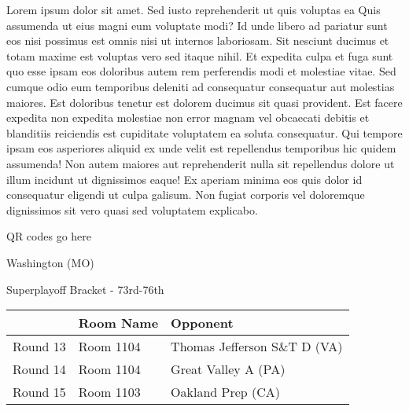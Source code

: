 \documentclass{article}%
\begin{document}
\vspace*{8pt}%
\linebreak%
\newline%
\newline%
Lorem ipsum dolor sit amet. Sed iusto reprehenderit ut quis voluptas ea Quis assumenda ut eius magni eum voluptate modi? Id unde libero ad pariatur sunt eos nisi possimus est omnis nisi ut internos laboriosam. Sit nesciunt ducimus et totam maxime est voluptas vero sed itaque nihil. Et expedita culpa et fuga sunt quo esse ipsam eos doloribus autem rem perferendis modi et molestiae vitae.\newline%
\newline%
Sed cumque odio eum temporibus deleniti ad consequatur consequatur aut molestias maiores. Est doloribus tenetur est dolorem ducimus sit quasi provident. Est facere expedita non expedita molestiae non error magnam vel obcaecati debitis et blanditiis reiciendis est cupiditate voluptatem ea soluta consequatur. Qui tempore ipsam eos asperiores aliquid ex unde velit est repellendus temporibus hic quidem assumenda!\newline%
\newline%
Non autem maiores aut reprehenderit nulla sit repellendus dolore ut illum incidunt ut dignissimos eaque! Ex aperiam minima eos quis dolor id consequatur eligendi ut culpa galisum. Non fugiat corporis vel doloremque dignissimos sit vero quasi sed voluptatem explicabo.\newline%
\newline%
%
\vspace*{30pt}%
\begin{center}%
\begin{Huge}%
QR codes go here%
\end{Huge}%
\end{center}%
\newpage%
\begin{center}%
\begin{Huge}%
Washington (MO)%
\end{Huge}%
\vspace*{8pt}%
\linebreak%
\begin{Large}%
Superplayoff Bracket {-} 73rd{-}76th%
\end{Large}%
\end{center}%
%
\begin{tabularx}{\textwidth}{|c|Y|Y|}%
\hline%
&Room Name&Opponent\\%
\hline%
Round 13&Room 1104&Thomas Jefferson S\&T D (VA)\\%
Round 14&Room 1104&Great Valley A (PA)\\%
Round 15&Room 1103&Oakland Prep (CA)\\%
\hline%
\end{tabularx}%
\end{document}
